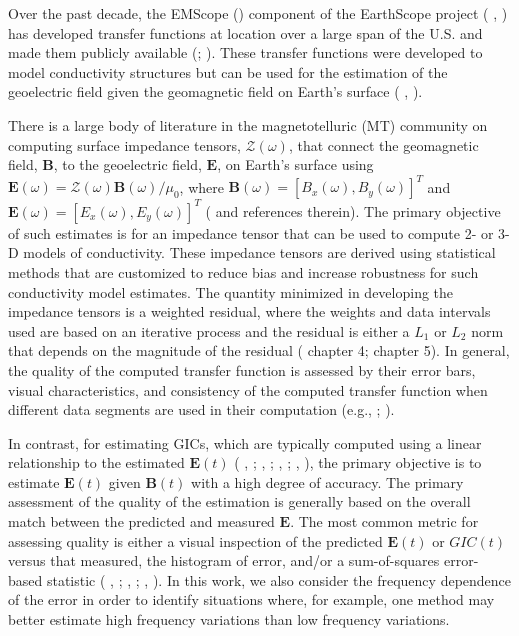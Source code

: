 \documentclass[12pt]{article}
\newcommand{\citeay}[1]{%
\citeauthor{#1}, \citeyear{#1}%
}
\begin{document}
Over the past decade, the EMScope (\cite{Schultz2009}) component of the EarthScope project (\citeay{Meltzer2003}) has developed transfer functions at location over a large span of the U.S. and made them publicly available (\cite{Kelbert2011}; \cite{Schultz2016}).  These transfer functions were developed to model conductivity structures but can be used for the estimation of the geoelectric field given the geomagnetic field on Earth's surface (\citeay{Bedrosian2015}).

There is a large body of literature in the magnetotelluric (MT) community on computing surface impedance tensors, $\mathcal{Z}(\omega)$, that connect the geomagnetic field, $\mathbf{B}$, to the geoelectric field, $\mathbf{E}$, on Earth's surface using $\mathbf{E}(\omega) = \mathcal{Z}(\omega)\mathbf{B}(\omega)/\mu_0$, where $\mathbf{B}(\omega) = [B_x(\omega),B_y(\omega)]^T$ and $\mathbf{E}(\omega) = [E_x(\omega),E_y(\omega)]^T$ (\cite{Chave2012} and references therein).  The primary objective of such estimates is for an impedance tensor that can be used to compute 2- or 3-D models of conductivity. These impedance tensors are derived using statistical methods that are customized to reduce bias and increase robustness for such conductivity model estimates.  The quantity minimized in developing the impedance tensors is a weighted residual, where the weights and data intervals used are based on an iterative process and the residual is either a $L_1$ or $L_2$ norm that depends on the magnitude of the residual (\cite{Simpson2005} chapter 4; \cite{Chave2012} chapter 5).  In general, the quality of the computed transfer function is assessed by their error bars, visual characteristics, and consistency of the computed transfer function when different data segments are used in their computation (e.g., \cite{Jones1989}; \cite{Fujii2015}).

In contrast, for estimating GICs, which are typically computed using a linear relationship to the estimated $\mathbf{E}(t)$ (\citeay{Lehtinen1985}; \citeay{Pulkkinen2010}; \citeay{Viljanen2012}; \citeay{NERC2015}), the primary objective is to estimate $\mathbf{E}(t)$ given $\mathbf{B}(t)$ with a high degree of accuracy.  The primary assessment of the quality of the estimation is generally based on the overall match between the predicted and measured $\mathbf{E}$.  The most common metric for assessing quality is either a visual inspection of the predicted $\mathbf{E}(t)$ or $GIC(t)$ versus that measured, the histogram of error, and/or a sum-of-squares error-based statistic  (\citeay{McKay2003}; \citeay{Pulkkinen2010}; \citeay{Love2014}).  In this work, we also consider the frequency dependence of the error in order to identify situations where, for example, one method may better estimate high frequency variations than low frequency variations.
\end{document}
